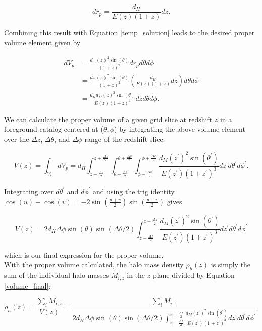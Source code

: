 \documentclass[12pt]{article}
\begin{document}
\begin{equation}\label{physical2comoving_inf}
dr_p=\frac{d_H}{E(z)(1+z)}dz.
\end{equation}

Combining this result with Equation \eqref{temp_solution} leads to the desired proper volume element given by

\begin{align}
dV_p&=\frac{d_m(z)^2\sin(\theta)}{(1+z)^2}dr_pd\theta d\phi\nonumber\\
&=\frac{d_m(z)^2\sin(\theta)}{(1+z)^2}\left(\frac{d_H}{E(z)(1+z)}dz\right)d\theta d\phi\nonumber\\
&=\frac{d_Hd_M(z)^2\sin(\theta)}{E(z)(1+z)^3}dzd\theta d\phi.
\end{align}

We can calculate the proper volume of a given grid slice at redshift $z$ in a foreground catalog centered at ($\theta,\phi$) by integrating the above volume element over the $\Delta z$, $\Delta\theta$, and $\Delta\phi$ range of the redshift slice:

\begin{equation}
V(z)=\int_{V_z}dV_p=d_H\int_{z-\frac{\Delta z}{2}}^{z+\frac{\Delta z}{2}}\int_{\theta-\frac{\Delta\theta}{2}}^{\theta+\frac{\Delta\theta}{2}}\int_{\phi-\frac{\Delta\phi}{2}}^{\phi+\frac{\Delta\phi}{2}} \frac{d_M(z^\prime)^2\sin(\theta^\prime)}{E(z^\prime)(1+z^\prime)^3}dz^\prime d\theta^\prime d\phi^\prime.
\end{equation}

Integrating over $d\theta^\prime$ and $d\phi^\prime$ and using the trig identity ${\cos(u)-\cos(v)=-2\sin\left(\frac{u+v}{2}\right)\sin\left(\frac{u-v}{2}\right)}$ gives

\begin{equation}\label{volume_final}
V(z)=2d_H\Delta\phi\sin(\theta)\sin(\Delta\theta/2)\int_{z-\frac{\Delta z}{2}}^{z+\frac{\Delta z}{2}} \frac{d_M(z^\prime)^2\sin(\theta^\prime)}{E(z^\prime)(1+z^\prime)^3}dz^\prime d\theta^\prime d\phi^\prime
\end{equation}

which is our final expression for the proper volume.\\

With the proper volume calculated, the halo mass density $\rho_h(z)$ is simply the sum of the individual halo masses $M_{i,z}$ in the $z$-plane divided by Equation \eqref{volume_final}:

\begin{equation}\label{rho_h}
\rho_h(z)=\frac{\sum_i M_{i,z}}{V(z)}=\frac{\sum_i M_{i,z}}{2d_H\Delta\phi\sin(\theta)\sin(\Delta\theta/2)\int_{z-\frac{\Delta z}{2}}^{z+\frac{\Delta z}{2}} \frac{d_M(z^\prime)^2\sin(\theta^\prime)}{E(z^\prime)(1+z^\prime)^3}dz^\prime d\theta^\prime d\phi^\prime}.
\end{equation}
\end{document}

